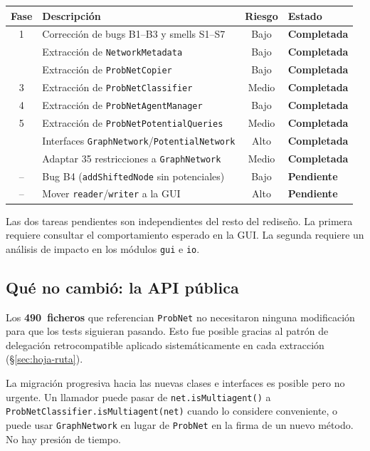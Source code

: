 \documentclass[11pt,a4paper]{article}
\newcommand{\code}[1]{\texttt{#1}}
\newcommand{\good}[1]{\textcolor{codegreen}{\textbf{#1}}}
\newcommand{\warn}[1]{\textcolor{warnorange}{\textbf{#1}}}
\begin{document}
\begin{center}
\begin{tabular}{clcl}
\toprule
\textbf{Fase} & \textbf{Descripción} & \textbf{Riesgo} & \textbf{Estado} \\
\midrule
1 & Corrección de bugs B1--B3 y smells S1--S7 & Bajo   & \good{Completada} \\
  & Extracción de \code{NetworkMetadata}       & Bajo   & \good{Completada} \\
  & Extracción de \code{ProbNetCopier}         & Bajo   & \good{Completada} \\
3 & Extracción de \code{ProbNetClassifier}     & Medio  & \good{Completada} \\
4 & Extracción de \code{ProbNetAgentManager}   & Bajo   & \good{Completada} \\
5 & Extracción de \code{ProbNetPotentialQueries} & Medio & \good{Completada} \\
  & Interfaces \code{GraphNetwork}/\code{PotentialNetwork} & Alto & \good{Completada} \\
  & Adaptar 35 restricciones a \code{GraphNetwork} & Medio & \good{Completada} \\
--& Bug B4 (\code{addShiftedNode} sin potenciales) & Bajo & \warn{Pendiente} \\
--& Mover \code{reader}/\code{writer} a la GUI    & Alto  & \warn{Pendiente} \\
\bottomrule
\end{tabular}
\end{center}

Las dos tareas pendientes son independientes del resto del rediseño.
La primera requiere consultar el comportamiento esperado en la GUI.
La segunda requiere un análisis de impacto en los módulos \code{gui} e
\code{io}.

\subsection{Qué no cambió: la API pública}

Los \textbf{490~ficheros} que referencian \code{ProbNet} no necesitaron
ninguna modificación para que los tests siguieran pasando.  Esto fue
posible gracias al patrón de delegación retrocompatible aplicado
sistemáticamente en cada extracción (§\ref{sec:hoja-ruta}).

La migración progresiva hacia las nuevas clases e interfaces es posible
pero no urgente.  Un llamador puede pasar de \code{net.isMultiagent()} a
\code{ProbNetClassifier.isMultiagent(net)} cuando lo considere conveniente,
o puede usar \code{GraphNetwork} en lugar de \code{ProbNet} en la firma de
un nuevo método.  No hay presión de tiempo.
\end{document}
